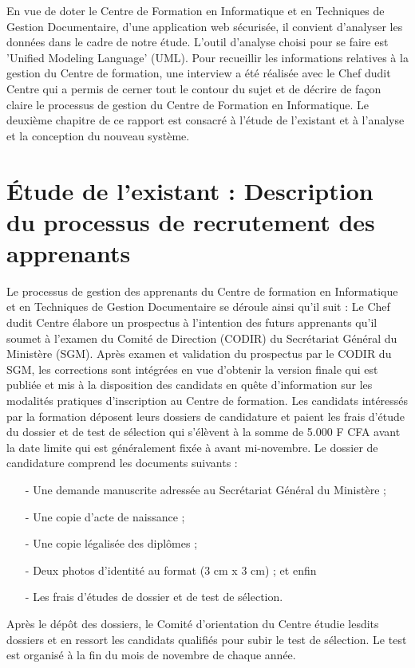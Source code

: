 \introduction

En vue de doter le Centre de Formation en Informatique et en Techniques de Gestion Documentaire, d’une application web sécurisée, il convient d'analyser les données dans le cadre de notre étude. L'outil d'analyse choisi pour se faire est 'Unified Modeling Language' (UML). 
Pour recueillir les informations relatives à la gestion du Centre de formation, une interview a été réalisée avec le Chef dudit Centre qui a permis de cerner tout le contour du sujet et de décrire de façon claire le processus de gestion du Centre de Formation en Informatique. 
Le deuxième chapitre de ce rapport est consacré à l'étude de l'existant et à l'analyse et la conception du nouveau système. 

\section{Étude de l'existant : Description du processus de recrutement des apprenants}

Le processus de gestion des apprenants du Centre de formation en Informatique et en Techniques de Gestion Documentaire se déroule ainsi qu'il suit :
Le Chef dudit Centre élabore un prospectus à l'intention des futurs apprenants qu'il soumet à l'examen du Comité de Direction (CODIR) du Secrétariat Général du Ministère (SGM). Après examen et validation du prospectus par le CODIR du SGM, les corrections sont intégrées en vue d'obtenir la version finale qui est publiée et mis à la disposition des candidats en quête d'information sur les modalités pratiques d'inscription au Centre de formation. 
Les candidats intéressés par la formation déposent leurs dossiers de candidature et paient les frais d'étude du dossier et de test de sélection qui s'élèvent à la somme de 5.000 F CFA avant la date limite qui est généralement fixée à avant mi-novembre. Le dossier de candidature comprend les documents suivants :

\begin{itemize}

	\item[-]Une demande manuscrite adressée au Secrétariat Général du Ministère ;
	\item[-]Une copie d'acte de naissance ;
	\item[-]Une copie légalisée des diplômes ; 
	\item[-]Deux photos d'identité au format (3 cm x 3 cm) ; et enfin
	\item[-]Les frais d'études de dossier et de test de sélection.

\end{itemize}
Après le dépôt des dossiers, le Comité d'orientation du Centre étudie lesdits dossiers et en ressort les candidats qualifiés pour subir le test de sélection. Le test est organisé à la fin du mois de novembre de chaque année.
